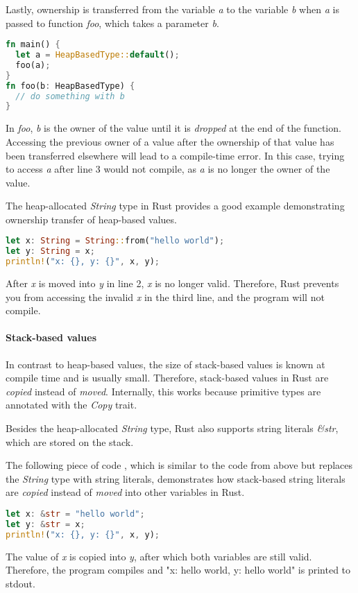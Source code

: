 \documentclass[sigplan,11pt,nonacm]{acmart}
\begin{document}
Lastly, ownership is transferred from the variable \emph{a} to the variable \emph{b} when \emph{a} is passed to function \emph{foo}, which takes a parameter \emph{b}.
\begin{lstlisting}[language=Rust]
fn main() {
  let a = HeapBasedType::default();
  foo(a);
}
fn foo(b: HeapBasedType) {
  // do something with b
}
\end{lstlisting}
In \emph{foo}, \emph{b} is the owner of the value until it is \emph{dropped} at the end of the function.
Accessing the previous owner of a value after the ownership of that value has been transferred elsewhere will lead to a compile-time error.
In this case, trying to access \emph{a} after line 3 would not compile, as \emph{a} is no longer the owner of the value.

The heap-allocated \emph{String} type in Rust provides a good example demonstrating ownership transfer of heap-based values.
\begin{lstlisting}[language=Rust]
let x: String = String::from("hello world");
let y: String = x;
println!("x: {}, y: {}", x, y);
\end{lstlisting}
After \emph{x} is moved into \emph{y} in line 2, \emph{x} is no longer valid.
Therefore, Rust prevents you from accessing the invalid \emph{x} in the third line, and the program will not compile.


\paragraph{Stack-based values}

In contrast to heap-based values, the size of stack-based values is known at compile time and is usually small.
Therefore, stack-based values in Rust are \emph{copied} instead of \emph{moved}.
Internally, this works because primitive types are annotated with the \emph{Copy} trait.

Besides the heap-allocated \emph{String} type, Rust also supports string literals \emph{\&str}, which are stored on the stack.

The following piece of code \cite{rust-book}, which is similar to the code from above but replaces the \emph{String} type with string literals, demonstrates how stack-based string literals are \emph{copied} instead of \emph{moved} into other variables in Rust.
\begin{lstlisting}[language=Rust]
let x: &str = "hello world";
let y: &str = x;
println!("x: {}, y: {}", x, y);
\end{lstlisting}
The value of \emph{x} is copied into \emph{y}, after which both variables are still valid.
Therefore, the program compiles and "x: hello world, y: hello world" is printed to stdout.
\end{document}
